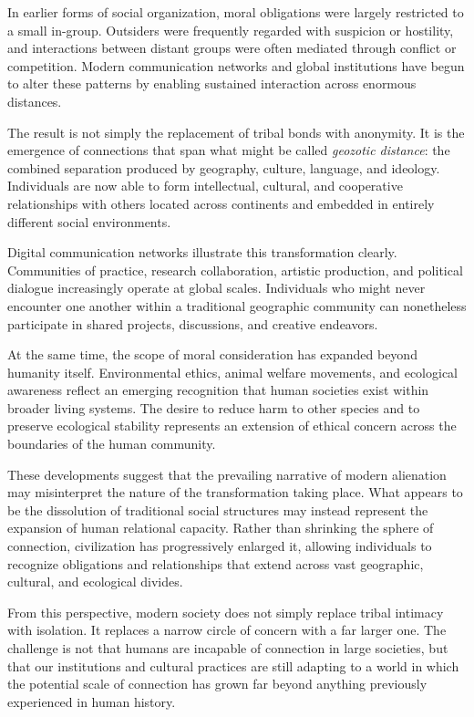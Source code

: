 \documentclass[12pt]{article}
\begin{document}
In earlier forms of social organization, moral obligations were largely restricted to a small in-group. Outsiders were frequently regarded with suspicion or hostility, and interactions between distant groups were often mediated through conflict or competition. Modern communication networks and global institutions have begun to alter these patterns by enabling sustained interaction across enormous distances.

The result is not simply the replacement of tribal bonds with anonymity. It is the emergence of connections that span what might be called \emph{geozotic distance}: the combined separation produced by geography, culture, language, and ideology. Individuals are now able to form intellectual, cultural, and cooperative relationships with others located across continents and embedded in entirely different social environments.

Digital communication networks illustrate this transformation clearly. Communities of practice, research collaboration, artistic production, and political dialogue increasingly operate at global scales. Individuals who might never encounter one another within a traditional geographic community can nonetheless participate in shared projects, discussions, and creative endeavors.

At the same time, the scope of moral consideration has expanded beyond humanity itself. Environmental ethics, animal welfare movements, and ecological awareness reflect an emerging recognition that human societies exist within broader living systems. The desire to reduce harm to other species and to preserve ecological stability represents an extension of ethical concern across the boundaries of the human community.

These developments suggest that the prevailing narrative of modern alienation may misinterpret the nature of the transformation taking place. What appears to be the dissolution of traditional social structures may instead represent the expansion of human relational capacity. Rather than shrinking the sphere of connection, civilization has progressively enlarged it, allowing individuals to recognize obligations and relationships that extend across vast geographic, cultural, and ecological divides.

From this perspective, modern society does not simply replace tribal intimacy with isolation. It replaces a narrow circle of concern with a far larger one. The challenge is not that humans are incapable of connection in large societies, but that our institutions and cultural practices are still adapting to a world in which the potential scale of connection has grown far beyond anything previously experienced in human history.
\end{document}
